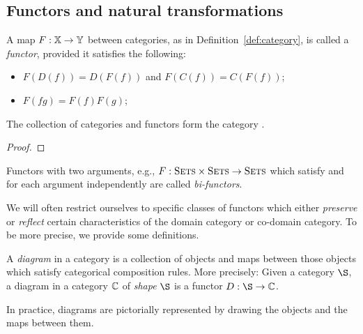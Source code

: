 
\subsection{Functors and natural transformations} %
\label{ssub:functors_and_natural_transformations}

\begin{definition}\label{def:functor}
  A map $F:\mathbb{X} \to \mathbb{Y}$ between categories, as in Definition~\ref{def:category}, is called a
  \emph{functor}, provided it satisfies the following:
  \begin{itemize}
    \item[\axiom{F}{1}] $F(D(f)) = D(F(f))$ and $F(C(f)) = C(F(f))$;
    \item[\axiom{F}{2}] $F(f g) = F(f)F(g)$;
  \end{itemize}
\end{definition}

\begin{lemma}\label{lem:cat_is_a_category}
  The collection of categories and functors form the category \cat.
\end{lemma}
\begin{proof}
\end{proof}


Functors with two arguments, e.g., $F:\textsc{Sets} \times \textsc{Sets} \to \textsc{Sets}$ which satisfy  and
 for each argument independently are called \emph{bi-functors}.


We will often restrict ourselves to specific classes of functors which either \emph{preserve} or
\emph{reflect} certain characteristics of the domain category or co-domain category. To be more
precise, we provide some definitions.

\begin{definition}\label{def:diagram_in_a_category}
  A \emph{diagram} in a category is a collection of objects and maps between those objects
  which satisfy categorical composition rules. More precisely: Given a category $\S$, a diagram
  in a category $\mathbb{C}$ of \emph{shape} $\S$ is a functor $D:\S \to \C$.
\end{definition}

In practice, diagrams are pictorially represented by drawing the objects and the maps between them.

